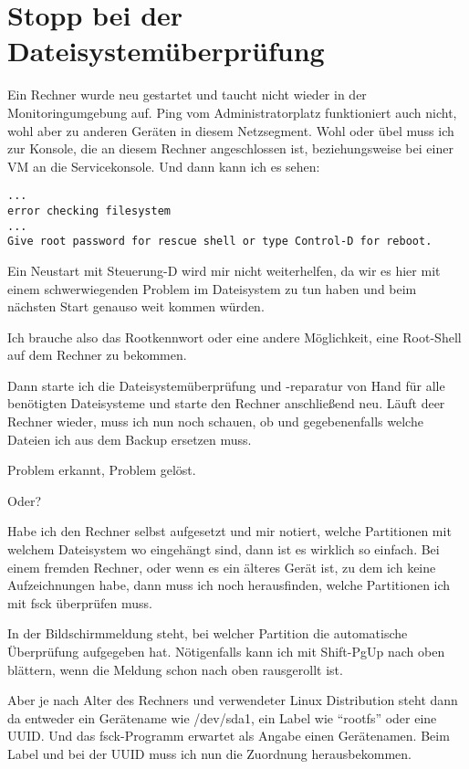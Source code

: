 \section{Stopp bei der Dateisystemüberprüfung}
\label{sec:lokal-stop-at-fsck}

Ein Rechner wurde neu gestartet und taucht nicht wieder in der
Monitoringumgebung auf. Ping vom Administratorplatz funktioniert auch nicht,
wohl aber zu anderen Geräten in diesem Netzsegment. Wohl oder übel muss ich
zur Konsole, die an diesem Rechner angeschlossen ist, beziehungsweise bei
einer VM an die Servicekonsole. Und dann kann ich es sehen:

\begin{verbatim}
...
error checking filesystem
...
Give root password for rescue shell or type Control-D for reboot.
\end{verbatim}

Ein Neustart mit Steuerung-D wird mir nicht weiterhelfen, da wir es hier mit
einem schwerwiegenden Problem im Dateisystem zu tun haben und beim nächsten
Start genauso weit kommen würden.

Ich brauche also das Rootkennwort oder eine andere Möglichkeit, eine
Root-Shell auf dem Rechner zu bekommen.

Dann starte ich die Dateisystemüberprüfung und -reparatur von Hand für alle
benötigten Dateisysteme und starte den Rechner anschließend neu. Läuft deer
Rechner wieder, muss ich nun noch schauen, ob und gegebenenfalls welche
Dateien ich aus dem Backup ersetzen muss.

Problem erkannt, Problem gelöst.

Oder?

Habe ich den Rechner selbst aufgesetzt und mir notiert, welche Partitionen mit
welchem Dateisystem wo eingehängt sind, dann ist es wirklich so einfach. Bei
einem fremden Rechner, oder wenn es ein älteres Gerät ist, zu dem ich keine
Aufzeichnungen habe, dann muss ich noch herausfinden, welche Partitionen ich
mit fsck überprüfen muss.

In der Bildschirmmeldung steht, bei welcher Partition die automatische
Überprüfung aufgegeben hat. Nötigenfalls kann ich mit Shift-PgUp nach oben
blättern, wenn die Meldung schon nach oben rausgerollt ist.

Aber je nach Alter des Rechners und verwendeter Linux Distribution steht dann
da entweder ein Gerätename wie /dev/sda1, ein Label wie ``rootfs'' oder eine
UUID. Und das fsck-Programm erwartet als Angabe einen Gerätenamen. Beim Label
und bei der UUID muss ich nun die Zuordnung herausbekommen.


